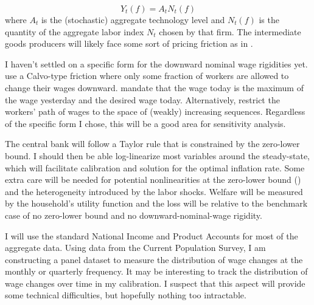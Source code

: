 \documentclass[12pt,a4paper]{scrartcl}            %
\begin{document}
\begin{equation*}
    Y_t(f) = A_t N_t(f)
\end{equation*}
where $A_t$ is the (stochastic) aggregate technology level and $N_t(f)$ is the quantity of the aggregate labor index $N_t$ chosen by that firm.
The intermediate goods producers will likely face some sort of pricing friction as in \cite{calvo_1983}.

I haven't settled on a specific form for the downward nominal wage rigidities yet.
\cite{daly_hobijn_2013} use a Calvo-type friction where only some fraction of workers are allowed to change their wages downward.
\cite{coibon_gorodnichenko_wieland_2012} mandate that the wage today is the maximum of the wage yesterday and the desired wage today.
Alternatively, \cite{benigno_ricci_2011} restrict the workers' path of wages to the space of (weakly) increasing sequences.
Regardless of the specific form I chose, this will be a good area for sensitivity analysis.

The central bank will follow a Taylor rule that is constrained by the zero-lower bound.
I should then be able log-linearize most variables around the steady-state, which will facilitate calibration and solution for the optimal inflation rate.
Some extra care will be needed for potential nonlinearities at the zero-lower bound (\citealt{fv_gordon_gq_rr_2012}) and the heterogeneity introduced by the labor shocks.
Welfare will be measured by the household's utility function and the loss will be relative to the benchmark case of no zero-lower bound and no downward-nominal-wage rigidity.

I will use the standard National Income and Product Accounts for most of the aggregate data.
Using data from the Current Population Survey, I am constructing a panel dataset to measure the distribution of wage changes at the monthly or quarterly frequency.
It may be interesting to track the distribution of wage changes over time in my calibration.
I suspect that this aspect will provide some technical difficulties, but hopefully nothing too intractable.







\end{document}
